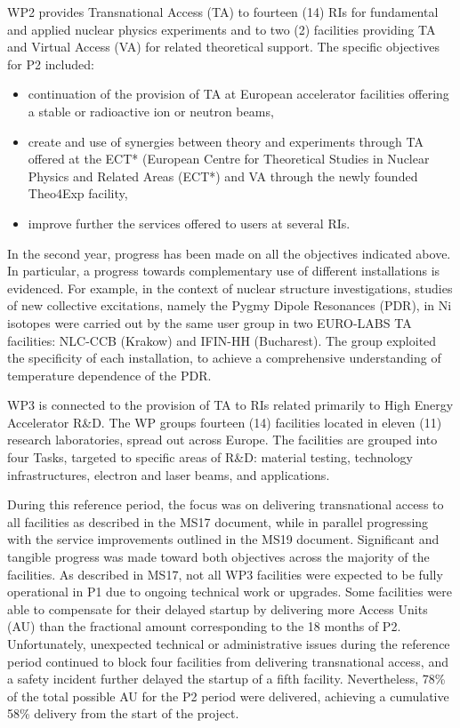 WP2 provides Transnational Access (TA) to fourteen (14) RIs for fundamental and applied nuclear physics experiments and to two (2) facilities providing TA and Virtual Access (VA) for related theoretical support. 
The specific objectives for P2 included: 
\begin{itemize}
    \item continuation of the provision of TA at European accelerator facilities offering a stable or radioactive ion or neutron beams,
    \item create and use of synergies between theory and experiments through TA offered at the ECT* (European Centre for Theoretical Studies in Nuclear Physics and Related Areas (ECT*) and VA through the newly founded Theo4Exp facility,
    \item improve further the services offered to users at several RIs.
\end{itemize}

In the second year, progress has been made on all the objectives indicated above.
In particular, a progress towards complementary use of different installations is evidenced. For example, in the context of nuclear structure investigations,  studies of new collective excitations, namely the Pygmy Dipole Resonances (PDR), in Ni isotopes were carried out by the same user group in two EURO-LABS TA facilities: NLC-CCB (Krakow) and IFIN-HH (Bucharest). The group exploited the specificity of each installation, to achieve a comprehensive understanding of temperature dependence of the PDR. 
 

WP3 is connected to the provision of TA to RIs related primarily to High Energy Accelerator R\&D. The WP groups fourteen (14) facilities located in eleven (11) research laboratories, spread out across Europe. The facilities are grouped into four Tasks, targeted to specific areas of R\&D: material testing, technology infrastructures, electron and laser beams, and applications. 

During this reference period, the focus was on delivering transnational access to all facilities as described in the MS17 document, while in parallel progressing with the service improvements outlined in the MS19 document. 
Significant and tangible progress was made toward both objectives across the majority of the facilities. As described in MS17, not all WP3 facilities were expected to be fully operational in P1 due to ongoing technical work or upgrades. Some facilities were able to compensate for their delayed startup by delivering more Access Units (AU) than the fractional amount corresponding to the 18 months of P2.
Unfortunately, unexpected technical or administrative issues during the reference period continued to block four facilities from delivering transnational access, and a safety incident further delayed the startup of a fifth facility. Nevertheless, 78\% of the total possible AU for the P2 period were delivered, achieving a cumulative 58\% delivery from the start of the project.

